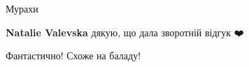 \begin{itemize}
 
Мурахи

\begin{itemize}
 
\textbf{Natalie Valevska} дякую, що дала зворотній відгук ❤️
\end{itemize}

 
Фантастично! Схоже на баладу!


\end{itemize}

